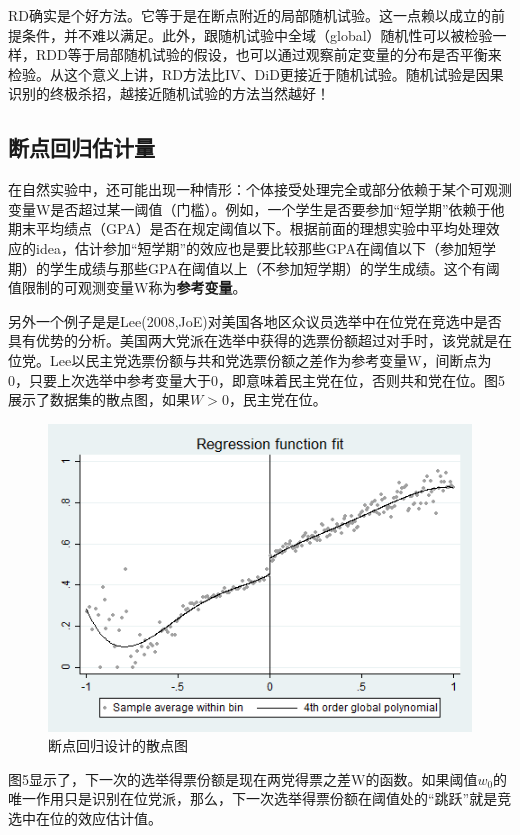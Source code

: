 \documentclass[cn,10pt,math=newtx,citestyle=gb7714-2015,bibstyle=gb7714-2015]{elegantbook}
\begin{document}
	RD确实是个好方法。它等于是在断点附近的局部随机试验。这一点赖以成立的前提条件，并不难以满足。此外，跟随机试验中全域（global）随机性可以被检验一样，RDD等于局部随机试验的假设，也可以通过观察前定变量的分布是否平衡来检验。从这个意义上讲，RD方法比IV、DiD更接近于随机试验。随机试验是因果识别的终极杀招，越接近随机试验的方法当然越好！
	
	\subsection{断点回归估计量}
	
	在自然实验中，还可能出现一种情形：个体接受处理完全或部分依赖于某个可观测变量W是否超过某一阈值（门槛）。例如，一个学生是否要参加“短学期”依赖于他期末平均绩点（GPA）是否在规定阈值以下。根据前面的理想实验中平均处理效应的idea，估计参加“短学期”的效应也是要比较那些GPA在阈值以下（参加短学期）的学生成绩与那些GPA在阈值以上（不参加短学期）的学生成绩。这个有阈值限制的可观测变量W称为\textbf{参考变量}。
	
	另外一个例子是是Lee(2008,JoE)对美国各地区众议员选举中在位党在竞选中是否具有优势的分析。美国两大党派在选举中获得的选票份额超过对手时，该党就是在位党。Lee以民主党选票份额与共和党选票份额之差作为参考变量W，间断点为0，只要上次选举中参考变量大于0，即意味着民主党在位，否则共和党在位。图5展示了数据集的散点图，如果$W>0$，民主党在位。
	\begin{figure}[htbp]
		\centering
		\includegraphics[width=1\textwidth]{rdgraph.png}
		\caption{断点回归设计的散点图}\label{fig:digit}
	\end{figure}
	
	图5显示了，下一次的选举得票份额是现在两党得票之差W的函数。如果阈值$w_0$的唯一作用只是识别在位党派，那么，下一次选举得票份额在阈值处的“跳跃”就是竞选中在位的效应估计值。
	
\end{document}

